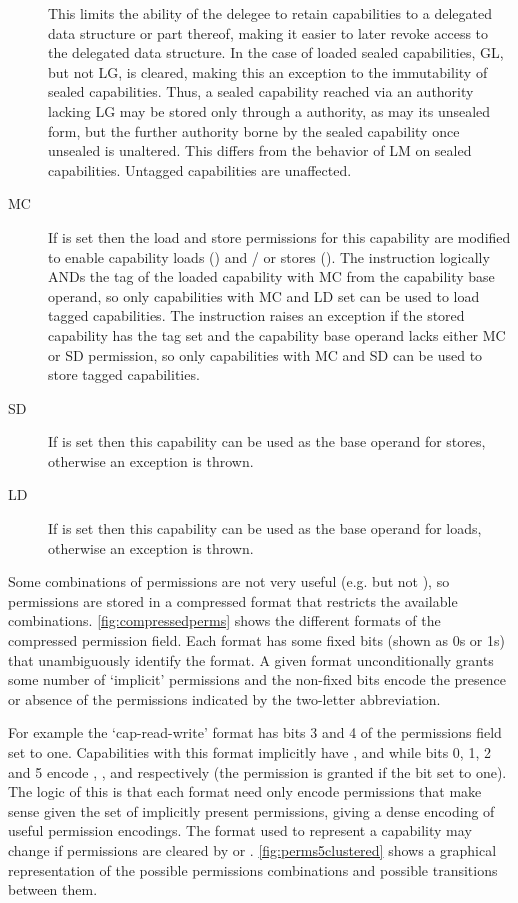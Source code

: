 \begin{description}
This limits the ability of the delegee to retain capabilities to a delegated data structure or part thereof, making it easier to later revoke access to the delegated data structure.
In the case of loaded sealed capabilities, GL, but not LG, is cleared, making this an exception to the immutability of sealed capabilities.
Thus, a sealed capability reached via an authority lacking LG may be stored only through a \cappermSLC authority,
as may its unsealed form, but the further authority borne by the sealed capability once unsealed is unaltered.
This differs from the behavior of LM on sealed capabilities.
Untagged capabilities are unaffected.
\item[MC] If \cappermMC is set then the load and store permissions for this capability are modified to enable capability loads (\cappermLC) and / or stores (\cappermSC).
The  instruction logically ANDs the tag of the loaded capability with MC from the capability base operand, so only capabilities with MC and LD set can be used to load tagged capabilities.
The  instruction raises an exception if the stored capability has the tag set and the capability base operand lacks either MC or SD permission, so only capabilities with MC and SD can be used to store tagged capabilities.
\item[SD] If \cappermS is set then this capability can be used as the base operand for stores, otherwise an exception is thrown.
\item[LD] If \cappermL is set then this capability can be used as the base operand for loads, otherwise an exception is thrown.
\end{description}

Some combinations of permissions are not very useful (e.g. \cappermASR but not \cappermX), so permissions are stored in a compressed format that restricts the available combinations.
\cref{fig:compressedperms} shows the different formats of the compressed permission field.
Each format has some fixed bits (shown as 0s or 1s) that unambiguously identify the format.
A given format unconditionally grants some number of `implicit' permissions and the non-fixed bits encode the presence or absence of the permissions indicated by the two-letter abbreviation.

For example the `cap-read-write' format has bits 3 and 4 of the permissions field set to one.
Capabilities with this format implicitly have \cappermL, \cappermMC and \cappermS while bits 0, 1, 2 and 5 encode \cappermILG, \cappermLM, \cappermSLC and \cappermG respectively (the permission is granted if the bit set to one).
The logic of this is that each format need only encode permissions that make sense given the set of implicitly present permissions, giving a dense encoding of useful permission encodings.
The format used to represent a capability may change if permissions are cleared by  or .
\cref{fig:perms5clustered} shows a graphical representation of the possible permissions combinations and possible transitions between them.

